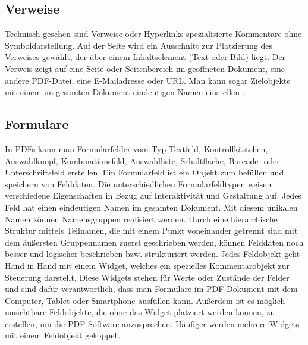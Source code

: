 \subsection{Verweise}
Technisch gesehen sind Verweise oder Hyperlinks spezialisierte Kommentare ohne Symboldarstellung. Auf der Seite wird ein Ausschnitt zur Platzierung des Verweises gewählt, der über einem Inhaltselement (Text oder Bild) liegt. Der Verweis zeigt auf eine Seite oder Seitenbereich im geöffneten Dokument, eine andere PDF-Datei, eine E-Mailadresse oder URL. Man kann sogar Zielobjekte mit einem im gesamten Dokument eindeutigen Namen einstellen \cite{softx}. 

\subsection{Formulare}
In PDFs kann man Formularfelder vom Typ Textfeld, Kontrollkästchen, Auswahlknopf, Kombinationsfeld, Auswahlliste, Schaltfläche, Barcode- oder Unterschriftsfeld erstellen. Ein Formularfeld ist ein Objekt zum befüllen und speichern von Felddaten. Die unterschiedlichen Formularfeldtypen weisen verschiedene Eigenschaften in Bezug auf Interaktivität und Gestaltung auf. Jedes Feld hat einen eindeutigen Namen im gesamten Dokument. Mit diesem unikalen Namen können Namensgruppen realisiert werden. Durch eine hierarchische Struktur mittels Teilnamen, die mit einem Punkt voneinander getrennt sind mit dem äußersten Gruppennamen zuerst geschrieben werden, können Felddaten noch besser und logischer beschrieben bzw. strukturiert werden. Jedes Feldobjekt geht Hand in Hand mit einem Widget, welches ein spezielles Kommentarobjekt zur Steuerung darstellt. Diese Widgets stehen für Werte oder Zustände der Felder und sind dafür verantwortlich, dass man Formulare im PDF-Dokument mit dem Computer, Tablet oder Smartphone ausfüllen kann. Außerdem ist es möglich unsichtbare Feldobjekte, die ohne das Widget platziert werden können, zu erstellen, um die PDF-Software anzusprechen. Häufiger werden mehrere Widgets mit einem Feldobjekt gekoppelt \cite{softx}. \\
